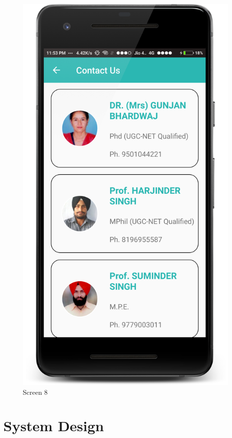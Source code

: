 \begin{figure}[ht]
\centering
\includegraphics[scale=0.38]{images/s8.png}
\caption{Screen 8}
\label{fig:8}
\end{figure}
\fi

\section{System Design}

